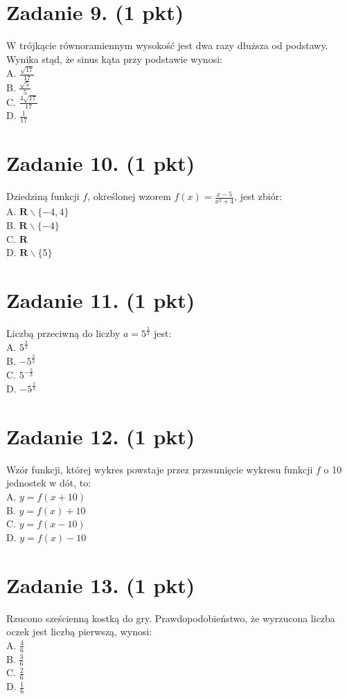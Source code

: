 \documentclass[10pt]{article}
\begin{document}
\section*{Zadanie 9. (1 pkt)}
W trójkącie równoramiennym wysokość jest dwa razy dłuższa od podstawy. Wynika stąd, że sinus kąta przy podstawie wynosi:\\
A. \(\frac{\sqrt{17}}{17}\)\\
B. \(\frac{\sqrt{5}}{5}\)\\
C. \(\frac{4 \sqrt{17}}{17}\)\\
D. \(\frac{1}{17}\)

\section*{Zadanie 10. (1 pkt)}
Dziedziną funkcji \(f\), określonej wzorem \(f(x)=\frac{x-5}{x^{2}+4}\), jest zbiór:\\
A. \(\boldsymbol{R} \backslash\{-4,4\}\)\\
B. \(\boldsymbol{R} \backslash\{-4\}\)\\
C. \(\boldsymbol{R}\)\\
D. \(\boldsymbol{R} \backslash\{5\}\)

\section*{Zadanie 11. (1 pkt)}
Liczbą przeciwną do liczby \(a=5^{\frac{2}{3}}\) jest:\\
A. \(5^{\frac{3}{2}}\)\\
B. \(-5^{\frac{3}{2}}\)\\
C. \(5^{-\frac{2}{3}}\)\\
D. \(-5^{\frac{2}{3}}\)

\section*{Zadanie 12. (1 pkt)}
Wzór funkcji, której wykres powstaje przez przesunięcie wykresu funkcji \(f\) o 10 jednostek w dót, to:\\
A. \(y=f(x+10)\)\\
B. \(y=f(x)+10\)\\
C. \(y=f(x-10)\)\\
D. \(y=f(x)-10\)

\section*{Zadanie 13. (1 pkt)}
Rzucono sześcienną kostką do gry. Prawdopodobieństwo, że wyrzucona liczba oczek jest liczbą pierwszą, wynosi:\\
A. \(\frac{4}{6}\)\\
B. \(\frac{3}{6}\)\\
C. \(\frac{2}{6}\)\\
D. \(\frac{1}{6}\)
\end{document}
